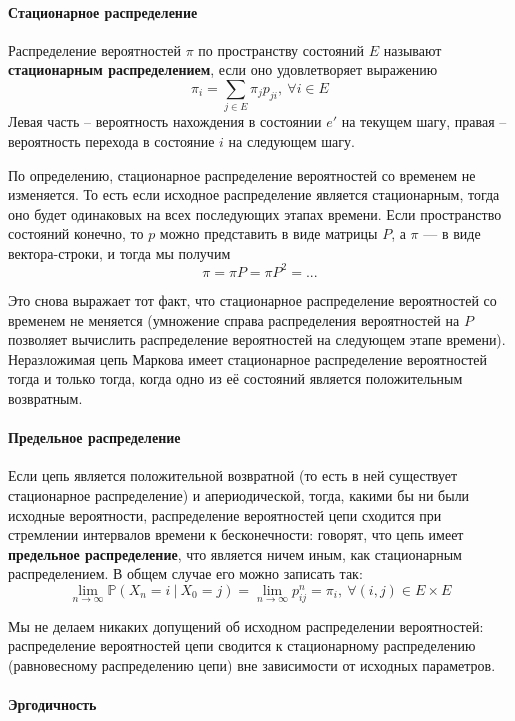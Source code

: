 \paragraph{Стационарное распределение}

Распределение вероятностей $\pi$ по пространству состояний $E$ называют \textbf{стационарным распределением}, если оно удовлетворяет выражению
\[
\pi_i = \sum_{j \in E} \pi_j p_{ji}, \  \forall i \in E
\]
Левая часть -- вероятность нахождения в состоянии $e'$ на текущем шагу, правая -- вероятность перехода в состояние $i$ на следующем шагу.

По определению, стационарное распределение вероятностей со временем не изменяется. То есть если исходное распределение является стационарным, тогда оно будет одинаковых на всех последующих этапах времени. Если пространство состояний конечно, то $p$ можно представить в виде матрицы $P$, а $\pi$ — в виде вектора-строки, и тогда мы получим
$$ \pi = \pi P = \pi P^2 = ... $$

Это снова выражает тот факт, что стационарное распределение вероятностей со временем не меняется (умножение справа распределения вероятностей на $P$ позволяет вычислить распределение вероятностей на следующем этапе времени). Неразложимая цепь Маркова имеет стационарное распределение вероятностей тогда и только тогда, когда одно из её состояний является положительным возвратным.

\paragraph{Предельное распределение}

Если цепь является положительной возвратной (то есть в ней существует стационарное распределение) и апериодической, тогда, какими бы ни были исходные вероятности, распределение вероятностей цепи сходится при стремлении интервалов времени к бесконечности: говорят, что цепь имеет \textbf{предельное распределение}, что является ничем иным, как стационарным распределением. В общем случае его можно записать так:
\[
\lim_{n \to \infty} \mathbb{P} (X_n = i \  | \  X_0 = j) = \lim_{n \to \infty} p_{ij}^n = \pi_i, \  \forall (i, j) \in E \times E
\]

Мы не делаем никаких допущений об исходном распределении вероятностей: распределение вероятностей цепи сводится к стационарному распределению (равновесному распределению цепи) вне зависимости от исходных параметров.

\paragraph{Эргодичность}

